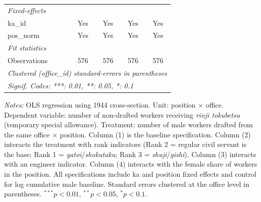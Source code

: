 \begin{table}[htbp]
\begin{threeparttable}
\begin{tabular}{lcccc}
   \emph{Fixed-effects}\\
   ka\_id                             & Yes           & Yes             & Yes                & Yes\\  
   pos\_norm                          & Yes           & Yes             & Yes                & Yes\\  
   \midrule
   \emph{Fit statistics}\\
   Observations                       & 576           & 576             & 576                & 576\\  
   \midrule \midrule
   \multicolumn{5}{l}{\emph{Clustered (office\_id) standard-errors in parentheses}}\\
   \multicolumn{5}{l}{\emph{Signif. Codes: ***: 0.01, **: 0.05, *: 0.1}}\\
\end{tabular}
\begin{tablenotes}[flushleft]
\footnotesize
\item \textit{Notes:} OLS regression using 1944 cross-section. Unit: position $\times$ office. Dependent variable: number of non-drafted workers receiving \emph{rinji tokubetsu} (temporary special allowance). Treatment: number of male workers drafted from the same office $\times$ position. Column (1) is the baseline specification. Column (2) interacts the treatment with rank indicators (Rank 2 = regular civil servant is the base; Rank 1 = \emph{yatoi}/\emph{shokutaku}; Rank 3 = \emph{shuji}/\emph{gishi}). Column (3) interacts with an engineer indicator. Column (4) interacts with the female share of workers in the position. All specifications include ka and position fixed effects and control for log cumulative male baseline. Standard errors clustered at the office level in parentheses. $^{***}p<0.01$, $^{**}p<0.05$, $^{*}p<0.1$.
\end{tablenotes}
\end{threeparttable}
\end{table}
